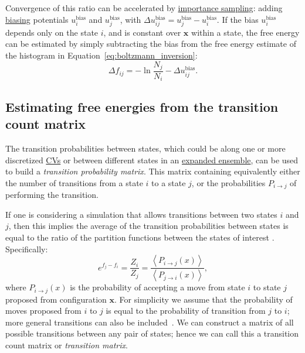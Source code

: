 \documentclass[9pt,review]{livecoms}
\newcommand{\vx}{\mathbf{x}}
\begin{document}
Convergence of this ratio can be accelerated by \hyperlink{ref:IS} {importance sampling}: adding \hyperlink{ref:biasingE} {biasing} potentials $u^{\mathrm{bias}}_i$ and $u^{\mathrm{bias}}_j$, with $\Delta u^{\mathrm{bias}}_{ij}=u^{\mathrm{bias}}_j - u^{\mathrm{bias}}_i$.
If the bias $u^{\mathrm{bias}}_i$ depends only on the state $i$, and is constant over $\vx$ within a state, the free energy can be estimated by simply subtracting the bias from the free energy estimate of the histogram in Equation~\ref{eq:boltzmann_inversion}: \begin{equation}
\Delta f_{ij} = -\ln \frac{N_j}{N_i} - \Delta u^{\mathrm{bias}}_{ij}.
\label{eq:boltzmann_inversion_biased}
\end{equation}

\subsection{Estimating free energies from the transition count matrix\label{sec:transition_matrix}}

The transition probabilities between states, which could be along one or more discretized \hyperlink{ref:CV} {CVs} or between different states in an \hyperlink{ref:ExpEns}{expanded ensemble}, can be used to build a \textit{transition probability matrix}. This matrix containing equivalently either the number of transitions from a state $i$ to a state $j$, or the probabilities $P_{i\rightarrow j}$ of performing the transition.

If one is considering a simulation that allows transitions between two states $i$ and $j$, then this implies the average of the transition probabilities between states is equal to the ratio of the partition functions between the states of interest \cite{deOliveira:EPJB:1998,Wang:JoSP:2002,escobedo_transition_2006}. Specifically:
\begin{equation}
e^{f_j-f_i} = \frac{Z_i}{Z_j} = \frac{\left \langle  P_{i\rightarrow j}(x)\right\rangle}{\left \langle P_{j\rightarrow i}(x) \right \rangle},
\end{equation}
where $P_{i\rightarrow j}(x)$ is the probability of accepting a move from state $i$ to state $j$ proposed from configuration $\vx$. For simplicity we assume that the probability of moves proposed from $i$ to $j$ is equal to the probability of transition from $j$ to $i$; more general transitions can also be included~\cite{escobedo_transition_2006}. We can construct a matrix of all possible transitions between any pair of states; hence we can call this a transition count matrix or \textit{transition matrix}.
\end{document}
